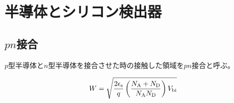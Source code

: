 \section{半導体とシリコン検出器}
\subsection{$pn$接合}
$p$型半導体と$n$型半導体を接合させた時の接触した領域を$pn$接合と呼ぶ。

\begin{equation}   %
    W = \sqrt{\frac{2\epsilon_{\rm{s}}}{q}\left(\frac{N_{\rm{A}}+N_{\rm{D}}}{N_{\rm{A}} N_{\rm{D}}}\right)V_{\rm{bi}}}
    \label{eq:bulk}
\end{equation}

